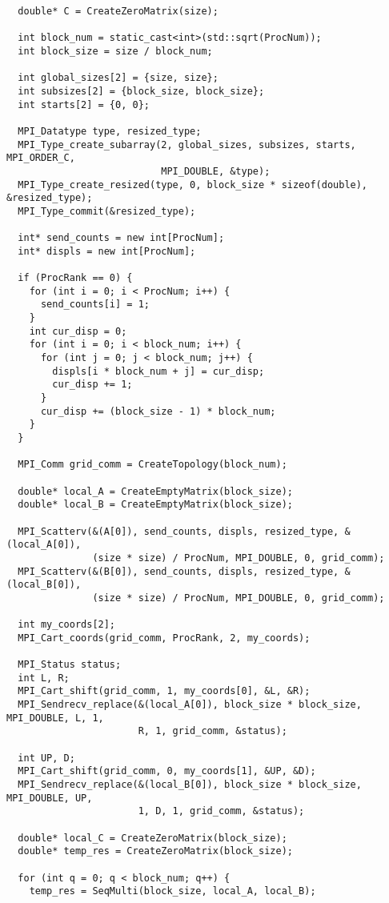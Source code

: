 \documentclass[12pt, letterpaper]{article}
\begin{document}
\begin{lstlisting}
  double* C = CreateZeroMatrix(size);

  int block_num = static_cast<int>(std::sqrt(ProcNum));
  int block_size = size / block_num;

  int global_sizes[2] = {size, size};
  int subsizes[2] = {block_size, block_size};
  int starts[2] = {0, 0};

  MPI_Datatype type, resized_type;
  MPI_Type_create_subarray(2, global_sizes, subsizes, starts, MPI_ORDER_C,
                           MPI_DOUBLE, &type);
  MPI_Type_create_resized(type, 0, block_size * sizeof(double), &resized_type);
  MPI_Type_commit(&resized_type);

  int* send_counts = new int[ProcNum];
  int* displs = new int[ProcNum];

  if (ProcRank == 0) {
    for (int i = 0; i < ProcNum; i++) {
      send_counts[i] = 1;
    }
    int cur_disp = 0;
    for (int i = 0; i < block_num; i++) {
      for (int j = 0; j < block_num; j++) {
        displs[i * block_num + j] = cur_disp;
        cur_disp += 1;
      }
      cur_disp += (block_size - 1) * block_num;
    }
  }

  MPI_Comm grid_comm = CreateTopology(block_num);

  double* local_A = CreateEmptyMatrix(block_size);
  double* local_B = CreateEmptyMatrix(block_size);

  MPI_Scatterv(&(A[0]), send_counts, displs, resized_type, &(local_A[0]),
               (size * size) / ProcNum, MPI_DOUBLE, 0, grid_comm);
  MPI_Scatterv(&(B[0]), send_counts, displs, resized_type, &(local_B[0]),
               (size * size) / ProcNum, MPI_DOUBLE, 0, grid_comm);

  int my_coords[2];
  MPI_Cart_coords(grid_comm, ProcRank, 2, my_coords);

  MPI_Status status;
  int L, R;
  MPI_Cart_shift(grid_comm, 1, my_coords[0], &L, &R);
  MPI_Sendrecv_replace(&(local_A[0]), block_size * block_size, MPI_DOUBLE, L, 1,
                       R, 1, grid_comm, &status);

  int UP, D;
  MPI_Cart_shift(grid_comm, 0, my_coords[1], &UP, &D);
  MPI_Sendrecv_replace(&(local_B[0]), block_size * block_size, MPI_DOUBLE, UP,
                       1, D, 1, grid_comm, &status);

  double* local_C = CreateZeroMatrix(block_size);
  double* temp_res = CreateZeroMatrix(block_size);

  for (int q = 0; q < block_num; q++) {
    temp_res = SeqMulti(block_size, local_A, local_B);


\end{lstlisting}
\end{document}
